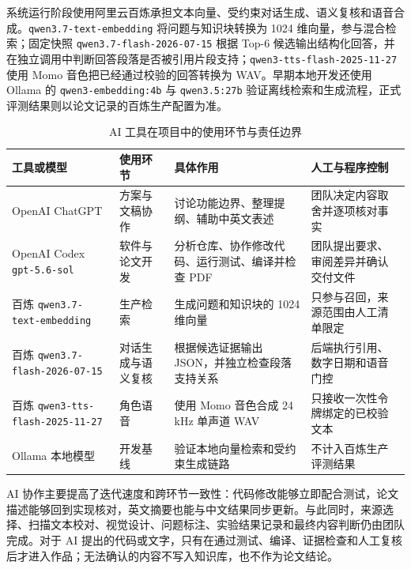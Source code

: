 \documentclass[UTF8,zihao=-4,fontset=none,twoside]{ctexart}
\newcommand{\code}[1]{\mbox{\texttt{#1}}\nobreak}
\begin{document}
系统运行阶段使用阿里云百炼承担文本向量、受约束对话生成、语义复核和语音合成。\code{qwen3.7-text-embedding} 将问题与知识块转换为 1024 维向量，参与混合检索；固定快照 \code{qwen3.7-flash-2026-07-15} 根据 Top-6 候选输出结构化回答，并在独立调用中判断回答段落是否被引用片段支持；\code{qwen3-tts-flash-2025-11-27} 使用 Momo 音色把已经通过校验的回答转换为 WAV。早期本地开发还使用 Ollama 的 \code{qwen3-embedding:4b} 与 \code{qwen3.5:27b} 验证离线检索和生成流程，正式评测结果则以论文记录的百炼生产配置为准。

\begin{table}[htbp]
\centering
\caption{AI 工具在项目中的使用环节与责任边界}
\label{tab:ai-tools}
\small
\begin{tabularx}{\linewidth}{@{}P{30mm}P{34mm}Y Y@{}}
\toprule
工具或模型 & 使用环节 & 具体作用 & 人工与程序控制 \\
\midrule
OpenAI ChatGPT & 方案与文稿协作 & 讨论功能边界、整理提纲、辅助中英文表述 & 团队决定内容取舍并逐项核对事实 \\
OpenAI Codex \code{gpt-5.6-sol} & 软件与论文开发 & 分析仓库、协作修改代码、运行测试、编译并检查 PDF & 团队提出要求、审阅差异并确认交付文件 \\
百炼 \code{qwen3.7-text-}\newline\code{embedding} & 生产检索 & 生成问题和知识块的 1024 维向量 & 只参与召回，来源范围由人工清单限定 \\
百炼 \code{qwen3.7-flash-}\newline\code{2026-07-15} & 对话生成与语义复核 & 根据候选证据输出 JSON，并独立检查段落支持关系 & 后端执行引用、数字日期和语音门控 \\
百炼 \code{qwen3-tts-}\newline\code{flash-}\newline\code{2025-11-27} & 角色语音 & 使用 Momo 音色合成 24 kHz 单声道 WAV & 只接收一次性令牌绑定的已校验文本 \\
Ollama 本地模型 & 开发基线 & 验证本地向量检索和受约束生成链路 & 不计入百炼生产评测结果 \\
\bottomrule
\end{tabularx}
\end{table}

AI 协作主要提高了迭代速度和跨环节一致性：代码修改能够立即配合测试，论文描述能够回到实现核对，英文摘要也能与中文结果同步更新。与此同时，来源选择、扫描文本校对、视觉设计、问题标注、实验结果记录和最终内容判断仍由团队完成。对于 AI 提出的代码或文字，只有在通过测试、编译、证据检查和人工复核后才进入作品；无法确认的内容不写入知识库，也不作为论文结论。
\end{document}
